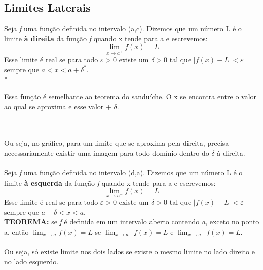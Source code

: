 \documentclass{article}
\begin{document}
		\subsection{Limites Laterais}
			Seja \textit{f} uma função definida no intervalo (a,c). Dizemos que um número L é o limite \textbf{à direita} da função \textit{f} quando x tende para a e escrevemos:
				\[ \lim_{x\to a^+}f(x)= L\]
			Esse limite é real se para todo $\varepsilon >0$ existe um $\delta>0$ tal que $|f(x)-L|<\varepsilon$ sempre que $a<x<a+\delta^*$.\\
			\hspace*{4cm} *
			\begin{minipage}{8cm}
				Essa função é semelhante ao teorema do sanduíche. O x se encontra entre o valor ao qual se aproxima e esse valor + $\delta$.
			\end{minipage}\\ \\
			Ou seja, no gráfico, para um limite que se aproxima pela direita, precisa necessariamente existir uma imagem para todo domínio dentro do $\delta$ à direita.\\
			\\
			 Seja \textit{f} uma função definida no intervalo (d,a). Dizemos que um número L é o limite \textbf{à esquerda} da função \textit{f} quando x tende para a e escrevemos:
				\[ \lim_{x\to a^-}f(x)= L\]
			Esse limite é real se para todo $\varepsilon >0$ existe um $\delta>0$ tal que $|f(x)-L|<\varepsilon$ sempre que $a-\delta<x<a$.\\
			\textbf{TEOREMA:} se \textit{f} é definida em um intervalo aberto contendo \textit{a}, exceto no ponto a, então $\lim_{x\to a}f(x) = L$ se $\lim_{x\to a^+}f(x) = L$ e $\lim_{x\to a^-}f(x) = L$.\\ \\
			Ou seja, só existe limite nos dois lados se existe o mesmo limite no lado direito e no lado esquerdo.
			
\end{document}

